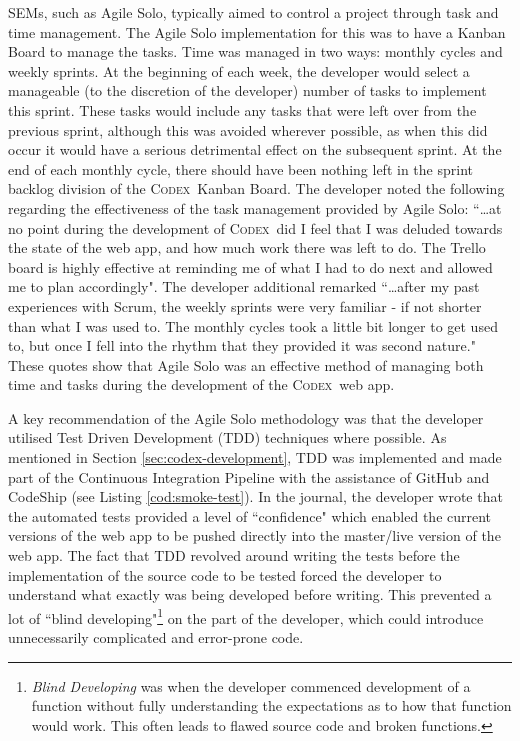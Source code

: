 \documentclass[final]{cmpreport}
\newcommand{\Codex}{\textsc{Codex}}
\begin{document}
		SEMs, such as Agile Solo, typically aimed to control a project through task and time management. The Agile Solo implementation for this was to have a Kanban Board to manage the tasks. Time was managed in two ways: monthly cycles and weekly sprints. At the beginning of each week, the developer would select a manageable (to the discretion of the developer) number of tasks to implement this sprint. These tasks would include any tasks that were left over from the previous sprint, although this was avoided wherever possible, as when this did occur it would have a serious detrimental effect on the subsequent sprint. At the end of each monthly cycle, there should have been nothing left in the sprint backlog division of the \Codex \ Kanban Board. The developer noted the following regarding the effectiveness of the task management provided by Agile Solo: ``\ldots at no point during the development of \Codex \ did I feel that I was deluded towards the state of the web app, and how much work there was left to do. The Trello board is highly effective at reminding me of what I had to do next and allowed me to plan accordingly". The developer additional remarked ``\ldots after my past experiences with Scrum, the weekly sprints were very familiar - if not shorter than what I was used to. The monthly cycles took a little bit longer to get used to, but once I fell into the rhythm that they provided it was second nature." These quotes show that Agile Solo was an effective method of managing both time and tasks during the development of the \Codex \ web app. 
		
		A key recommendation of the Agile Solo methodology was that the developer utilised Test Driven Development (TDD) techniques where possible. As mentioned in Section \ref{sec:codex-development}, TDD was implemented and made part of the Continuous Integration Pipeline with the assistance of GitHub and CodeShip (see Listing \ref{cod:smoke-test}). In the journal, the developer wrote that the automated tests provided a level of ``confidence" which enabled the current versions of the web app to be pushed directly into the master/live version of the web app. The fact that TDD revolved around writing the tests before the implementation of the source code to be tested forced the developer to understand what exactly was being developed before writing. This prevented a lot of ``blind developing"\footnote{\textit{Blind Developing} was when the developer commenced development of a function without fully understanding the expectations as to how that function would work. This often leads to flawed source code and broken functions.} on the part of the developer, which could introduce unnecessarily complicated and error-prone code. 
		
\end{document}
